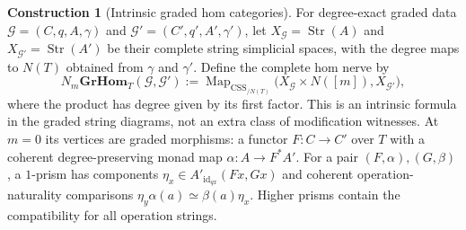\documentclass[oneside]{article}
\theoremstyle{plain}
\theoremstyle{definition}
\newtheorem{construction}[theorem]{Construction}
\theoremstyle{remark}
\newcommand{\Map}{\operatorname{Map}}
\newcommand{\id}{\operatorname{id}}
\begin{document}
\begin{construction}[Intrinsic graded hom categories]
\label{con:graded-homs}
For degree-exact graded data $\mathcal G=(C,q,A,\gamma)$ and
$\mathcal G'=(C',q',A',\gamma')$, let $X_{\mathcal G}=\operatorname{Str}(A)$
and $X_{\mathcal G'}=\operatorname{Str}(A')$ be their complete string
simplicial spaces, with the degree maps to $N(T)$ obtained from $\gamma$
and $\gamma'$. Define the complete hom nerve by
\begin{equation}\label{eq:graded-hom-nerve}
 N_m\mathbf{GrHom}_T(\mathcal G,\mathcal G')
 :=\Map_{\operatorname{CSS}_{/N(T)}}
 \bigl(X_{\mathcal G}\times N([m]),X_{\mathcal G'}\bigr),
\end{equation}
where the product has degree given by its first factor. This is an
intrinsic formula in the graded string diagrams, not an extra class of
modification witnesses. At $m=0$ its vertices are graded morphisms:
a functor $F:C\to C'$ over $T$ with a coherent degree-preserving
monad map $\alpha:A\to F^*A'$. For a pair $(F,\alpha),(G,\beta)$,
a $1$-prism has components
$\eta_x\in A'_{\id_{qx}}(Fx,Gx)$ and coherent operation-naturality
comparisons $\eta_y\alpha(a)\simeq\beta(a)\eta_x$.
Higher prisms contain the compatibility for all operation strings.
\end{construction}
\end{document}
